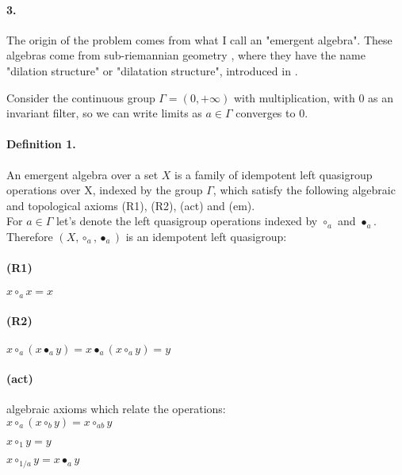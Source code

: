 \documentclass{article}
\begin{document}
\paragraph{3.} The origin of the problem comes from what I call an "emergent algebra". These algebras come from sub-riemannian geometry \cite{buligasub}, where they have the name "dilation structure" or "dilatation structure", introduced in \cite{buligadil1}. 

Consider the continuous group $\Gamma = (0,+\infty)$ with multiplication, with $0$ as an invariant filter, so we can write limits as $a \in \Gamma$ converges to $0$.  

\paragraph{Definition 1.} An emergent algebra over a set $X$ is a family of idempotent left quasigroup operations over X, 
indexed by the group $\Gamma$, which satisfy the following algebraic and topological axioms (R1), (R2), (act) and (em). \\


For $a \in \Gamma$ let's denote the left quasigroup operations indexed by $\circ_a$ and $\bullet_a$. Therefore 
$(X,\circ_a ,\bullet_a )$ is an idempotent left quasigroup: \\

\paragraph{(R1)} $ x \circ_a x = x$ 
 
\paragraph{(R2)} $ x \circ_a (x \bullet_a y) = x \bullet_a (x \circ_a y) = y$ \\
   




\paragraph{(act)} algebraic axioms which relate the operations: \\

      $ x \circ_a ( x \circ_b y) = x \circ_{ab} y $ 
      
      $ x \circ_1 y = y $
      
      $ x \circ_{1/a} y = x \bullet_a y $ \\
\end{document}

